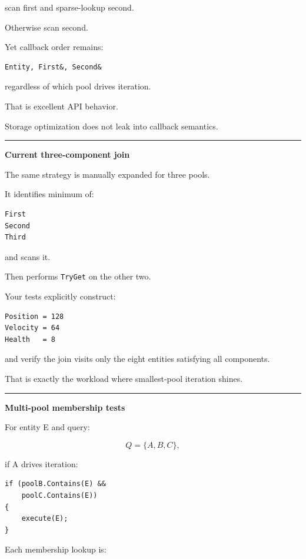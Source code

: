 scan first and sparse-lookup second.

Otherwise scan second.

Yet callback order remains:

\begin{verbatim}
Entity, First&, Second&
\end{verbatim}

regardless of which pool drives iteration.

That is excellent API behavior.

Storage optimization does not leak into callback semantics.

\begin{center}\rule{0.5\linewidth}{0.5pt}\end{center}

\textbf{Current three-component join}

The same strategy is manually expanded for three pools.

It identifies minimum of:

\begin{verbatim}
First
Second
Third
\end{verbatim}

and scans it.

Then performs \texttt{TryGet} on the other two.

Your tests explicitly construct:

\begin{verbatim}
Position = 128
Velocity = 64
Health   = 8
\end{verbatim}

and verify the join visits only the eight entities satisfying all components.

That is exactly the workload where smallest-pool iteration shines.

\begin{center}\rule{0.5\linewidth}{0.5pt}\end{center}

\textbf{Multi-pool membership tests}

For entity E and query:

\[
Q=\{A,B,C\},
\]

if A drives iteration:

\begin{verbatim}
if (poolB.Contains(E) &&
    poolC.Contains(E))
{
    execute(E);
}
\end{verbatim}

Each membership lookup is:

